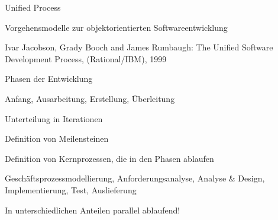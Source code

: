 \documentclass[a4paper]{article}
\begin{document}
\begin{multicols}{3}
  Unified Process
  \begin{itemize*}
    \item Vorgehensmodelle zur objektorientierten Softwareentwicklung
          \begin{itemize*}
            \item Ivar Jacobson, Grady Booch and James Rumbaugh: The Unified Software Development Process, (Rational/IBM), 1999
          \end{itemize*}
    \item Phasen der Entwicklung
          \begin{itemize*}
            \item Anfang, Ausarbeitung, Erstellung, Überleitung
            \item Unterteilung in Iterationen
            \item Definition von Meilensteinen
          \end{itemize*}
    \item Definition von Kernprozessen, die in den Phasen ablaufen
          \begin{itemize*}
            \item Geschäftsprozessmodellierung, Anforderungsanalyse, Analyse \& Design, Implementierung, Test, Auslieferung
            \item In unterschiedlichen Anteilen parallel ablaufend!
          \end{itemize*}
  \end{itemize*}


\end{multicols}
\end{document}
